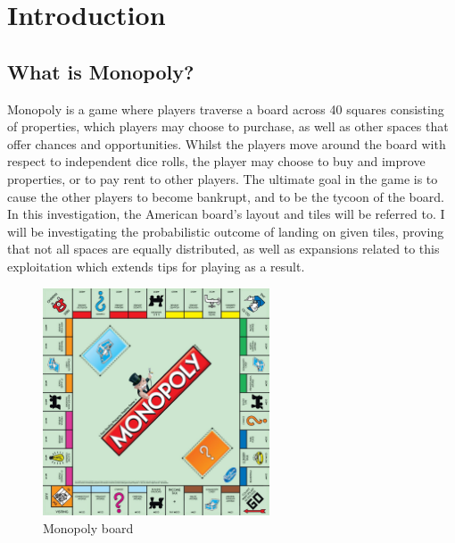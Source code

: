 \documentclass[12pt]{article}
\begin{document}
\tableofcontents
\thispagestyle{empty}
\cleardoublepage
\setcounter{page}{1}


\section{Introduction}
\subsection{What is Monopoly?}
Monopoly is a game where players traverse a board across 40 squares consisting of properties, which players may choose to purchase, as well as other spaces that offer chances and opportunities. Whilst the players move around the board with respect to independent dice rolls, the player may choose to buy and improve properties, or to pay rent to other players. The ultimate goal in the game is to cause the other players to become bankrupt, and to be the tycoon of the board. In this investigation, the American board's layout and tiles will be referred to. I will be investigating the probabilistic outcome of landing on given tiles, proving that not all spaces are equally distributed, as well as expansions related to this exploitation which extends tips for playing as a result.
\begin{figure}[h]
\centering
\includegraphics[width=0.6\textwidth]{board.jpg}
\caption{Monopoly board}
\end{figure}
\end{document}
